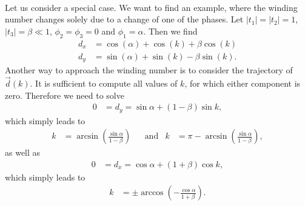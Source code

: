 \documentclass[english, parskip=full]{scrartcl}
\newcommand{\kla}{}
\newcommand{\tecxt}{}
\begin{document}
\\
Let us consider a special case.
We want to find an example, where the winding number changes solely due to a change of one of the phases.
Let $|t_1|=|t_2|=1$, $|t_3|=\beta\ll 1$, $\phi_2=\phi_3=0$ and $\phi_1=\alpha$.
Then we find
\begin{align}
d_x&=\cos(\alpha) + \cos(k) + \beta\cos(k)\\
d_y&=\sin(\alpha) + \sin(k) - \beta\sin(k).
\end{align}
Another way to approach the winding number is to consider the trajectory of $\vec{d}(k)$.
It is sufficient to compute all values of $k$, for which either component is zero.
Therefore we need to solve
\begin{align}
0&=d_y=\sin\alpha + (1-\beta)\sin k,
\end{align}
which simply leads to 
\begin{align}
k&=\arcsin\kla\left( \frac{\sin\alpha}{1-\beta} \right)&&\tecxt\text{and}&k&=\pi - \arcsin\kla\left( \frac{\sin\alpha}{1-\beta} \right),
\end{align}
as well as 
\begin{align}
0&=d_x=\cos\alpha + (1+\beta)\cos k,
\end{align}
which simply leads to 
\begin{align}
k&=\pm\arccos\kla\left( -\frac{\cos\alpha}{1+\beta} \right).
\end{align}
\end{document}
